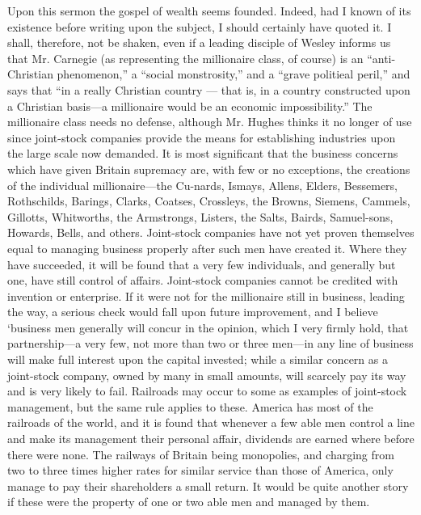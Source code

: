 \documentclass[11pt,openany]{book}
\begin{document}
Upon this sermon the gospel of wealth seems founded. Indeed, had I known of its existence before writing upon the subject, I should certainly have quoted it. I shall, therefore, not be shaken, even if a leading disciple of Wesley informs us that Mr. Carnegie (as representing the millionaire class, of course) is an ``anti-Christian phenomenon,'' a ``social monstrosity,'' and a ``grave politieal peril,'' and says that ``in a really Christian country --- that is, in a country constructed upon a Christian basis---a millionaire would be an economic impossibility.'' The millionaire class needs no defense, although Mr. Hughes thinks it no longer of use since joint-stock companies provide the means for establishing industries upon the large scale now demanded. It is most significant that the business concerns which have given Britain supremacy are, with few or no exceptions, the creations of the individual millionaire---the Cu-nards, Ismays, Allens, Elders, Bessemers, Rothschilds, Barings, Clarks, Coatses, Crossleys, the Browns, Siemens, Cammels, Gillotts, Whitworths, the Armstrongs, Listers, the Salts, Bairds, Samuel-sons, Howards, Bells, and others. Joint-stock companies have not yet proven themselves equal to managing business properly after such men have created it. Where they have succeeded, it will be found that a very few individuals, and generally but one, have still control of affairs. Joint-stock companies cannot be credited with invention or enterprise. If it were not for the millionaire still in business, leading the way, a serious check would fall upon future improvement, and I believe `business men generally will concur in the opinion, which I very firmly hold, that partnership---a very few, not more than two or three men---in any line of business will make full interest upon the capital invested; while a similar concern as a joint-stock company, owned by many in small amounts, will scarcely pay its way and is very likely to fail. Railroads may occur to some as examples of joint-stock management, but the same rule applies to these. America has most of the railroads of the world, and it is found that whenever a few able men control a line and make its management their personal affair, dividends are earned where before there were none. The railways of Britain being monopolies, and charging from two to three times higher rates for similar service than those of America, only manage to pay their shareholders a small return. It would be quite another story if these were the property of one or two able men and managed by them.
\end{document}
